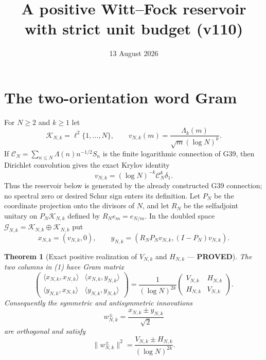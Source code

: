 \documentclass[11pt]{article}
\title{A positive Witt--Fock reservoir with strict unit budget (v110)}
\date{13 August 2026}
\newcommand{\PROVED}{\textcolor{green!40!black}{\textbf{PROVED}}}
\newtheorem{theorem}{Theorem}
\begin{document}
\maketitle

\section{The two-orientation word Gram}

For $N\ge2$ and $k\ge1$ let
\[
 \mathscr K_{N,k}=\ell^2\{1,\ldots,N\},
 \qquad
 v_{N,k}(m)=\frac{\Lambda_k(m)}{\sqrt m(\log N)^k}.
\]
If $\mathcal C_N=\sum_{n\le N}\Lambda(n)n^{-1/2}S_n$ is the finite
logarithmic connection of G39, then Dirichlet convolution gives the exact
Krylov identity
\begin{equation}
                 v_{N,k}=(\log N)^{-k}\mathcal C_N^k\delta_1. \tag{0}
\end{equation}
Thus the reservoir below is generated by the already constructed G39
connection; no spectral zero or desired Schur sign enters its definition.
Let $P_N$ be the coordinate projection onto the divisors of $N$, and let
$R_N$ be the selfadjoint unitary on $P_N\mathscr K_{N,k}$ defined by
$R_Ne_m=e_{N/m}$.  In the doubled space
$\mathscr G_{N,k}=\mathscr K_{N,k}\oplus\mathscr K_{N,k}$ put
\begin{equation}
 x_{N,k}=(v_{N,k},0),
 \qquad
 y_{N,k}=(R_NP_Nv_{N,k},(I-P_N)v_{N,k}).                      \tag{1}
\end{equation}

\begin{theorem}[Exact positive realization of $V_{N,k}$ and $H_{N,k}$ ---
\PROVED]
The two columns in (1) have Gram matrix
\begin{equation}
 \begin{pmatrix}
  \langle x_{N,k},x_{N,k}\rangle&
  \langle x_{N,k},y_{N,k}\rangle\\
  \langle y_{N,k},x_{N,k}\rangle&
  \langle y_{N,k},y_{N,k}\rangle
 \end{pmatrix}
 =\frac1{(\log N)^{2k}}
 \begin{pmatrix}V_{N,k}&H_{N,k}\\H_{N,k}&V_{N,k}\end{pmatrix}. \tag{2}
\end{equation}
Consequently the symmetric and antisymmetric innovations
\begin{equation}
 w_{N,k}^{\pm}=\frac{x_{N,k}\pm y_{N,k}}{\sqrt2}              \tag{3}
\end{equation}
are orthogonal and satisfy
\begin{equation}
 \|w_{N,k}^{\pm}\|^2
 =\frac{V_{N,k}\pm H_{N,k}}{(\log N)^{2k}}.                  \tag{4}
\end{equation}
\end{theorem}
\end{document}
